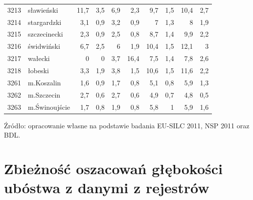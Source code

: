 \begin{center}
\begin{longtable}{lp{3cm}rrrrrrrr}
3213 & sławieński              & 11,7    & 3,5         & 6,9      & 2,3          & 9,7      & 1,5          & 10,4     & 2,7          \\
3214 & stargardzki             & 3,1     & 0,9         & 3,2      & 0,9          & 7        & 1,3          & 8        & 1,9          \\
3215 & szczecinecki            & 2,3     & 0,9         & 2,5      & 0,8          & 8,7      & 1,4          & 9,9      & 2,2          \\
3216 & świdwiński              & 6,7     & 2,5         & 6        & 1,9          & 10,4     & 1,5          & 12,1     & 3            \\
3217 & wałecki                 & 0       & 0           & 3,7      & 16,4         & 7,5      & 1,4          & 7,8      & 2,6          \\
3218 & łobeski                 & 3,3     & 1,9         & 3,8      & 1,5          & 10,6     & 1,5          & 11,6     & 2,2          \\
3261 & m.Koszalin              & 1,6     & 0,9         & 1,7      & 0,8          & 5,1      & 0,8          & 5,9      & 1,3          \\
3262 & m.Szczecin              & 2,7     & 0,6         & 2,7      & 0,6          & 4,9      & 0,7          & 4,8      & 0,5          \\
3263 & m.Świnoujście           & 1,7     & 0,8         & 1,9      & 0,8          & 5,8      & 1            & 5,9      & 1,6         \\
\hline
\end{longtable}
\small{Źródło: opracowanie własne na podstawie badania EU-SILC 2011, NSP 2011 oraz BDL.}
\end{center}

\newpage

\section{Zbieżność oszacowań głębokości ubóstwa z danymi z rejestrów}


